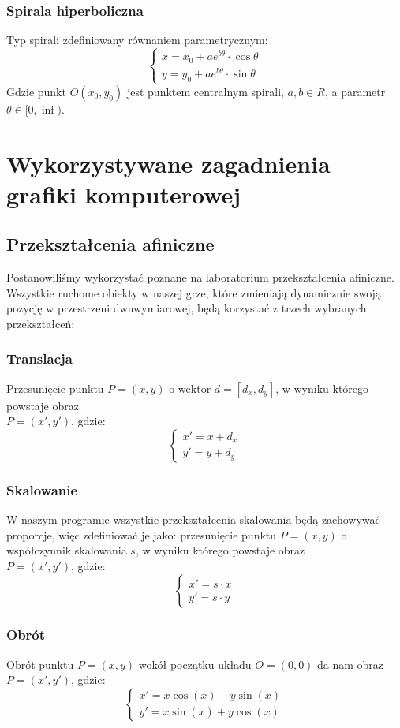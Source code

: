 \documentclass[a4paper,twoside]{article}
\begin{document}
	\subsubsection{Spirala hiperboliczna}
	Typ spirali zdefiniowany równaniem parametrycznym:
	$$
	\begin{cases}
	x=x_0+ae^{b\theta} \cdot \cos{\theta}\\
	y=y_0+ae^{b\theta} \cdot \sin{\theta}
	\end{cases}
	$$
	Gdzie punkt $ O(x_0, y_0) $ jest punktem centralnym spirali, $ a,b \in R $, a parametr $ \theta \in [0, \inf ) $.
	
	\newpage
	\section{Wykorzystywane zagadnienia grafiki komputerowej}
	\subsection{Przekształcenia afiniczne}
	Postanowiliśmy wykorzystać poznane na laboratorium przekształcenia afiniczne. Wszystkie ruchome obiekty w naszej grze, które zmieniają dynamicznie swoją pozycję w przestrzeni dwuwymiarowej, będą korzystać z trzech wybranych przekształceń:
	\subsubsection{Translacja}
	Przesunięcie punktu $ P=(x, y) $ o wektor $ d=[d_x, d_y] $, w wyniku którego powstaje obraz\\ $ P=(x', y') $, gdzie:
	$$
	\begin{cases}
	x'=x+d_x\\
	y'=y+d_y
	\end{cases}
	$$
	\subsubsection{Skalowanie}
	W naszym programie wszystkie przekształcenia skalowania będą zachowywać proporcje, więc zdefiniować je jako: przesunięcie punktu $ P=(x, y) $ o współczynnik skalowania $ s $, w wyniku którego powstaje obraz\\ $ P=(x', y') $, gdzie:
	$$
	\begin{cases}
	x'=s\cdot x\\
	y'=s\cdot y
	\end{cases}
	$$
	\subsubsection{Obrót}
	Obrót punktu $ P=(x, y) $ wokół początku układu $ O=(0, 0) $ da nam obraz $ P=(x', y') $, gdzie:
	$$
	\begin{cases}
	x'=x\cos(x)-y\sin(x)\\
	y'=x\sin(x)+y\cos(x)
	\end{cases}
	$$
	
\end{document}
